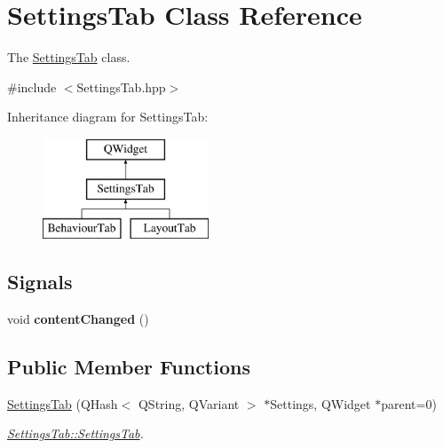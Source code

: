 \hypertarget{classSettingsTab}{\section{Settings\+Tab Class Reference}
\label{classSettingsTab}
}


The \hyperlink{classSettingsTab}{Settings\+Tab} class.  




{\ttfamily \#include $<$Settings\+Tab.\+hpp$>$}

Inheritance diagram for Settings\+Tab\+:\begin{figure}[H]
\begin{center}
\leavevmode
\includegraphics[height=3.000000cm]{classSettingsTab}
\end{center}
\end{figure}
\subsection*{Signals}
\begin{DoxyCompactItemize}
\item 
\hypertarget{classSettingsTab_ab72744b5433a111f3e79da0ef1d9af74}{void {\bfseries content\+Changed} ()}\label{classSettingsTab_ab72744b5433a111f3e79da0ef1d9af74}

\end{DoxyCompactItemize}
\subsection*{Public Member Functions}
\begin{DoxyCompactItemize}
\item 
\hyperlink{classSettingsTab_a8872d7984c5e66776e4d91db5ba761aa}{Settings\+Tab} (Q\+Hash$<$ Q\+String, Q\+Variant $>$ $\ast$Settings, Q\+Widget $\ast$parent=0)
\begin{DoxyCompactList}\small\item\em \hyperlink{classSettingsTab_a8872d7984c5e66776e4d91db5ba761aa}{Settings\+Tab\+::\+Settings\+Tab}. \end{DoxyCompactList}\end{DoxyCompactItemize}

